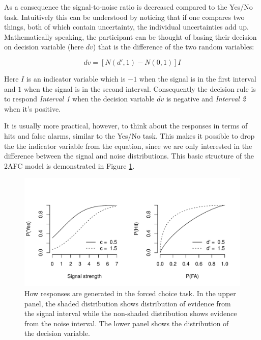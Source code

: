 \documentclass{article}\usepackage{knitr}
\begin{document}
As a consequence the signal-to-noise ratio is decreased compared to the Yes/No task. Intuitively this can be understood by noticing that if one compares two things, both of which contain uncertainty, the individual uncertainties add up. Mathematically speaking, the participant can be thought of basing their decision on decision variable (here $dv$) that is the difference of the two random variables:

\begin{equation}
dv = [N(d', 1) - N(0, 1)] I
\end{equation}

Here $I$ is an indicator variable which  is $-1$ when the signal is in the first interval and $1$ when the signal is in the second interval. Consequently the decision rule is to respond \textit{Interval 1} when the decision variable $dv$ is negative and \textit{Interval 2} when it's positive. 

It is usually more practical, however, to think about the responses in terms of hits and false alarms, similar to the Yes/No task. This makes it possible to drop the the indicator variable from the equation, since we are only interested in the difference between the signal and noise distributions. This basic structure of the 2AFC model is demonstrated in Figure \ref{fig:2AFC}. 

\begin{figure}[!htb]
\centering
\begin{knitrout}
\color{fgcolor}
\includegraphics[width=\maxwidth]{figure/unnamed-chunk-6-1} 

\end{knitrout}
\caption{How responses are generated in the forced choice task. In the upper panel, the shaded distribution shows distribution of evidence from the signal interval while the non-shaded distribution shows evidence from the noise interval. The lower panel shows the distribution of the decision variable. }
\label{fig:2AFC}
\end{figure}
\end{document}
